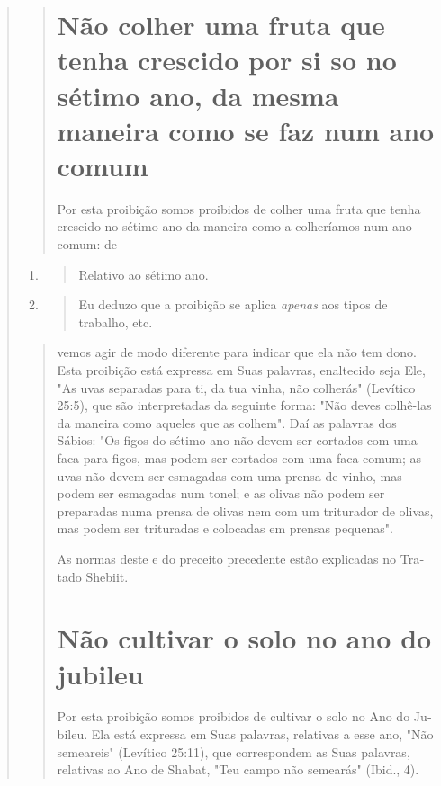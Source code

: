 \begin{quote}
\begin{quote}
\section{Não colher uma fruta que tenha crescido por si so no sétimo ano, da
mesma maneira como se faz num ano comum}

Por esta proibição somos proibidos de colher uma fruta que tenha
crescido no sétimo ano da maneira como a colheríamos num ano comum: de-
\end{quote}

\begin{enumerate}
\def\labelenumi{\arabic{enumi}.}
\setcounter{enumi}{390}
\item
 \begin{quote}
 Relativo ao sétimo ano.
 \end{quote}
\item
 \begin{quote}
 Eu deduzo que a proibição se aplica \emph{apenas} aos tipos de
 trabalho, etc.
 \end{quote}
\end{enumerate}

\begin{quote}vemos agir de modo diferente para indicar que ela 
não tem dono. Esta
proibi­ção está expressa em Suas palavras, enaltecido seja Ele, "As uvas
separadas para ti, da tua vinha, não colherás" (Levítico 25:5), que são
interpretadas da seguin­te forma: "Não deves colhê-las da maneira como
aqueles que as colhem". Daí as palavras dos Sábios: "Os figos do sétimo
ano não devem ser cortados com uma faca para figos, mas podem ser
cortados com uma faca comum; as uvas não devem ser esmagadas com uma
prensa de vinho, mas podem ser esmaga­das num tonel; e as olivas não
podem ser preparadas numa prensa de olivas nem com um triturador de
olivas, mas podem ser trituradas e colocadas em prensas pequenas".

As normas deste e do preceito precedente estão explicadas no Tra­tado
Shebiit.

\section{Não cultivar o solo no ano do jubileu}

Por esta proibição somos proibidos de cultivar o solo no Ano do
Ju­bileu. Ela está expressa em Suas palavras, relativas a esse ano, "Não
semeareis" (Levítico 25:11), que correspondem as Suas palavras,
relativas ao Ano de Sha­bat, "Teu campo não semearás" (Ibid., 4).


\end{quote}
\end{quote}
